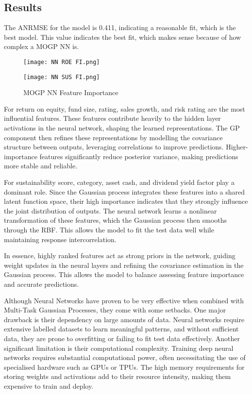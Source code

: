 \subsection{Results}
The ANRMSE for the model is 0.411, indicating a reasonable fit, which is the best model. This value indicates the best fit, which makes sense because of how complex a MOGP NN is.

\begin{figure}[H]
    \centering
    \begin{minipage}[b]{0.49\textwidth}
        \centering
        \texttt{[image: NN ROE FI.png]} %
    \end{minipage}
    \hfill
    \begin{minipage}[b]{0.49\textwidth}
        \centering
        \texttt{[image: NN SUS FI.png]} %
    \end{minipage}
    \caption{MOGP NN Feature Importance}
    \label{fig:sidebyside_minipage2}
\end{figure}

\noindent 
For return on equity, fund size, rating, sales growth, and risk rating are the most influential features. These features contribute heavily to the hidden layer activations in the neural network, shaping the learned representations. The GP component then refines these representations by modelling the covariance structure between outputs, leveraging correlations to improve predictions. Higher-importance features significantly reduce posterior variance, making predictions more stable and reliable.

For sustainability score, category, asset cash, and dividend yield factor play a dominant role. Since the Gaussian process integrates these features into a shared latent function space, their high importance indicates that they strongly influence the joint distribution of outputs. The neural network learns a nonlinear transformation of these features, which the Gaussian process then smooths through the RBF. This allows the model to fit the test data well while maintaining response intercorrelation.

In essence, highly ranked features act as strong priors in the network, guiding weight updates in the neural layers and refining the covariance estimation in the Gaussian process. This allows the model to balance assessing feature importance and accurate predictions.

Although Neural Networks have proven to be very effective when combined with Multi-Task Gaussian Processes, they come with some setbacks.
One major drawback is their dependency on large amounts of data. Neural networks require extensive labelled datasets to learn meaningful patterns, and without sufficient data, they are prone to overfitting or failing to fit test data effectively. 
Another significant limitation is their computational complexity. Training deep neural networks requires substantial computational power, often necessitating the use of specialised hardware such as GPUs or TPUs. The high memory requirements for storing weights and activations add to their resource intensity, making them expensive to train and deploy.


